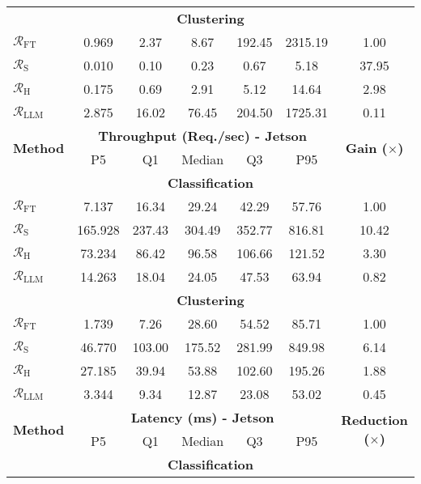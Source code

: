 \begin{table}[t]
\begin{tabular}{lcccccc}
\multicolumn{7}{c}{\textbf{Clustering}} \\  %
$\mathcal{R}_\text{FT}$ & 0.969 & 2.37 & 8.67 & 192.45 & 2315.19 & 1.00 \\ %
$\mathcal{R}_\text{S}$ & 0.010 & 0.10 & 0.23 & 0.67 & 5.18 & 37.95 \\ %
$\mathcal{R}_\text{H}$ & 0.175 & 0.69 & 2.91 & 5.12 & 14.64 & 2.98 \\ %
$\mathcal{R}_\text{LLM}$ & 2.875 & 16.02 & 76.45 & 204.50 & 1725.31 & 0.11 \\ %
\midrule
\multirow{2}{*}{\textbf{Method}} 
& \multicolumn{5}{c}{\textbf{Throughput (Req./sec) - Jetson}} & \multirow{2}{*}{\textbf{Gain ($\times$)}} \\
\cmidrule(lr){2-6}
 & P5 & Q1 & Median & Q3 & P95 & \\
\midrule
\multicolumn{7}{c}{\textbf{Classification}} \\  %
$\mathcal{R}_\text{FT}$ & 7.137 & 16.34 & 29.24 & 42.29 & 57.76 & 1.00 \\ %
$\mathcal{R}_\text{S}$ & 165.928 & 237.43 & 304.49 & 352.77 & 816.81 & 10.42 \\ %
$\mathcal{R}_\text{H}$ & 73.234 & 86.42 & 96.58 & 106.66 & 121.52 & 3.30 \\ %
$\mathcal{R}_\text{LLM}$ & 14.263 & 18.04 & 24.05 & 47.53 & 63.94 & 0.82 \\ %
\multicolumn{7}{c}{\textbf{Clustering}} \\  %
$\mathcal{R}_\text{FT}$ & 1.739 & 7.26 & 28.60 & 54.52 & 85.71 & 1.00 \\ %
$\mathcal{R}_\text{S}$ & 46.770 & 103.00 & 175.52 & 281.99 & 849.98 & 6.14 \\ %
$\mathcal{R}_\text{H}$ & 27.185 & 39.94 & 53.88 & 102.60 & 195.26 & 1.88 \\ %
$\mathcal{R}_\text{LLM}$ & 3.344 & 9.34 & 12.87 & 23.08 & 53.02 & 0.45 \\ %
\midrule
\multirow{2}{*}{\textbf{Method}} 
& \multicolumn{5}{c}{\textbf{Latency (ms) - Jetson}} & \multirow{2}{*}{\textbf{Reduction ($\times$)}} \\
\cmidrule(lr){2-6}
& P5 & Q1 & Median & Q3 & P95 & \\
\midrule
\multicolumn{7}{c}{\textbf{Classification}} \\  %

\end{tabular}
\end{table}
